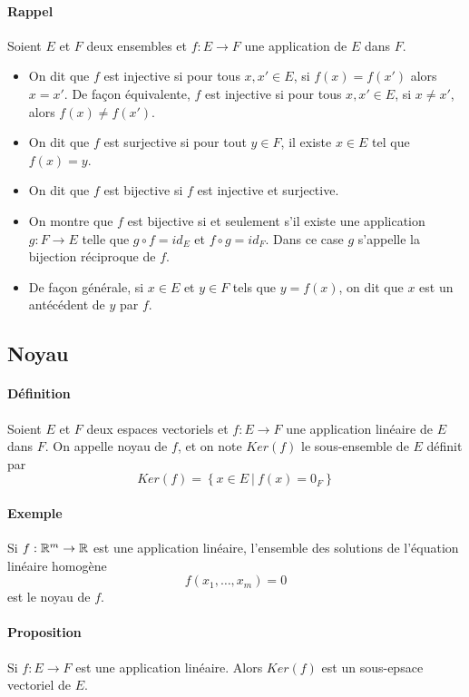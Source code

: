 \paragraph{Rappel} Soient $E$ et $F$ deux ensembles et $f: E \rightarrow F$ une application de $E$ dans $F$.
\begin{itemize}
 \item On dit que $f$ est injective si pour tous $x, x' \in E$, si $f(x) = f(x')$ alors $x=x'$. De façon équivalente, $f$ est injective si pour tous $x, x' \in E$, si $x \neq x'$, alors $f(x) \neq f(x')$.
  \item On dit que $f$ est surjective si pour tout $y \in F$, il existe $x \in E$ tel que $f(x) = y$. 
  \item On dit que $f$ est bijective si $f$ est injective et surjective.
  \item On montre que $f$ est bijective si et seulement s'il existe une application $g: F \rightarrow E$ telle que $g \circ f = id_E$ et $f \circ g = id_F$. Dans ce case $g$ s'appelle la bijection réciproque de $f$.
  \item De façon générale, si $x \in E$ et $y \in F$ tels que $y = f(x)$, on dit que $x$ est un antécédent de $y$ par $f$.
\end{itemize}

%
\subsection{Noyau}
%
\paragraph{Définition} Soient $E$ et $F$ deux espaces vectoriels et $f: E \rightarrow F$ une application linéaire de $E$ dans $F$. On appelle noyau de $f$, et on note $Ker(f)$ le sous-ensemble de $E$ définit par
$$Ker(f) = \left\{ x\in E ~ \vert ~ f(x) = 0_F \right\}$$

\paragraph{Exemple} Si $f: \mathbb{R}^m \rightarrow \mathbb{R}$ est une application linéaire, l'ensemble des solutions de l'équation linéaire homogène
$$f(x_1, \ldots, x_m) = 0$$
est le noyau de $f$.

\paragraph{Proposition} Si $f: E \rightarrow F$ est une application linéaire. Alors $Ker(f)$ est un sous-epsace vectoriel de $E$.

